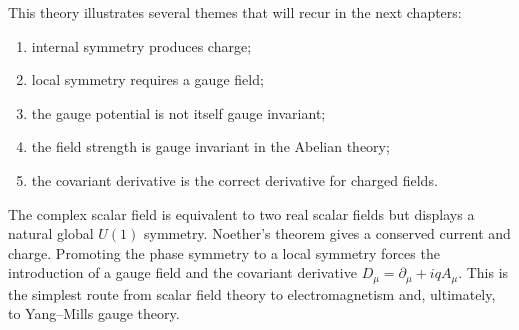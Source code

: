 This theory illustrates several themes that will recur in the next chapters:
\begin{enumerate}
    \item internal symmetry produces charge;
    \item local symmetry requires a gauge field;
    \item the gauge potential is not itself gauge invariant;
    \item the field strength is gauge invariant in the Abelian theory;
    \item the covariant derivative is the correct derivative for charged fields.
\end{enumerate}

\begin{summarybox}
The complex scalar field is equivalent to two real scalar fields but displays a
natural global \(U(1)\) symmetry. Noether's theorem gives a conserved current
and charge. Promoting the phase symmetry to a local symmetry forces the
introduction of a gauge field and the covariant derivative
\(D_\mu=\partial_\mu+iqA_\mu\). This is the simplest route from scalar field
theory to electromagnetism and, ultimately, to Yang--Mills gauge theory.
\end{summarybox}
